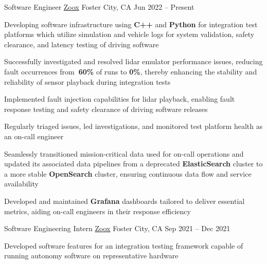\documentclass[]{awesome-cv}
\begin{document}
\begin{cventries}
	\cventry
	{Software Engineer}
	{\href{https://zoox.com/}{Zoox}}
	{Foster City, CA}
	{Jun 2022 – Present}
	{\begin{cvitems}
        \item Developing software infrastructure using \textbf{C++} and \textbf{Python} for integration test platforms which utilize simulation and vehicle logs for system validation, safety clearance, and latency testing of driving software
        \item Successfully investigated and resolved lidar emulator performance issues, reducing fault occurrences from\textbf{~60\%} of runs to \textbf{0\%}, thereby enhancing the stability and reliability of sensor playback during integration tests
        \item Implemented fault injection capabilities for lidar playback, enabling fault response testing and safety clearance of driving software releases
        \item Regularly triaged issues, led investigations, and monitored test platform health as an on-call engineer
        \item Seamlessly transitioned mission-critical data used for on-call operations and updated its associated data pipelines from a deprecated \textbf{ElasticSearch} cluster to a more stable \textbf{OpenSearch} cluster, ensuring continuous data flow and service availability
        \item Developed and maintained \textbf{Grafana} dashboards tailored to deliver essential metrics, aiding on-call engineers in their response efficiency
	\end{cvitems}}
	\cventry
	{Software Engineering Intern}
	{\href{https://zoox.com/}{Zoox}}
	{Foster City, CA}
	{Sep 2021 – Dec 2021}
	{\begin{cvitems}
	    \item Developed software features for an integration testing framework capable of running autonomy software on representative hardware

\end{cvitems}}
\end{cventries}
\end{document}
